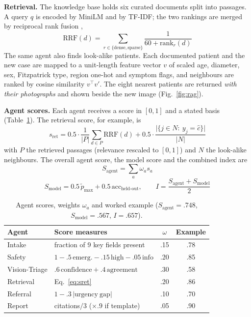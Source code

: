 \documentclass[conference]{IEEEtran}
\begin{document}
\textbf{Retrieval.} The knowledge base holds six curated documents split into passages. A query $q$ is encoded by MiniLM \cite{wang2020} and by TF-IDF; the two rankings are merged by reciprocal rank fusion \cite{cormack2009},
\begin{equation}
\mathrm{RRF}(d)=\sum_{r\in\{\mathrm{dense},\mathrm{sparse}\}}\frac{1}{60+\mathrm{rank}_r(d)}
\label{eq:rrf}
\end{equation}
The same agent also finds look-alike patients. Each documented patient and the new case are mapped to a unit-length feature vector $v$ of scaled age, diameter, sex, Fitzpatrick type, region one-hot and symptom flags, and neighbours are ranked by cosine similarity $v^{\top}v'$. The eight nearest patients are returned \emph{with their photographs} and shown beside the new image (Fig.~\ref{fig:rag}).

\textbf{Agent scores.} Each agent receives a score in $[0,1]$ and a stated basis (Table~\ref{tab:agents}). The retrieval score, for example, is
\begin{equation}
s_{\mathrm{ret}}=0.5\cdot\frac1{|P|}\sum_{d\in P}\mathrm{RRF}(d)+0.5\cdot\frac{\bigl|\{j\in N:\ y_j=\hat c\}\bigr|}{|N|}
\label{eq:sret}
\end{equation}
with $P$ the retrieved passages (relevance rescaled to $[0,1]$) and $N$ the look-alike neighbours. The overall agent score, the model score and the combined index are
\begin{equation}
S_{\mathrm{agent}}=\sum_{a}\omega_a s_a
\label{eq:sagent}
\end{equation}
\begin{equation}
S_{\mathrm{model}}=0.5\,\tilde p_{\max}+0.5\,\mathrm{acc}_{\mathrm{held\text{-}out}},\qquad
I=\frac{S_{\mathrm{agent}}+S_{\mathrm{model}}}{2}
\label{eq:smodel}
\end{equation}

\begin{table}[!t]
\caption{Agent scores, weights $\omega_a$ and worked example ($S_{\mathrm{agent}}=.748$, $S_{\mathrm{model}}=.567$, $I=.657$).}
\label{tab:agents}
\centering\scriptsize\setlength{\tabcolsep}{2.4pt}
\begin{tabular}{llcc}
\toprule
Agent & Score measures & $\omega$ & Example \\
\midrule
Intake & fraction of 9 key fields present & .15 & .78 \\
Safety & $1-.5\,\mathrm{emerg.}-.15\,\mathrm{high}-.05\,\mathrm{info}$ & .20 & .85 \\
Vision-Triage & $.6\,\mathrm{confidence}+.4\,\mathrm{agreement}$ & .30 & .58 \\
Retrieval & Eq.~\eqref{eq:sret} & .20 & .86 \\
Referral & $1-.3\,|\mathrm{urgency\ gap}|$ & .10 & .70 \\
Report & citations$/3$ ($\times .9$ if template) & .05 & .90 \\
\bottomrule
\end{tabular}
\end{table}
\end{document}

